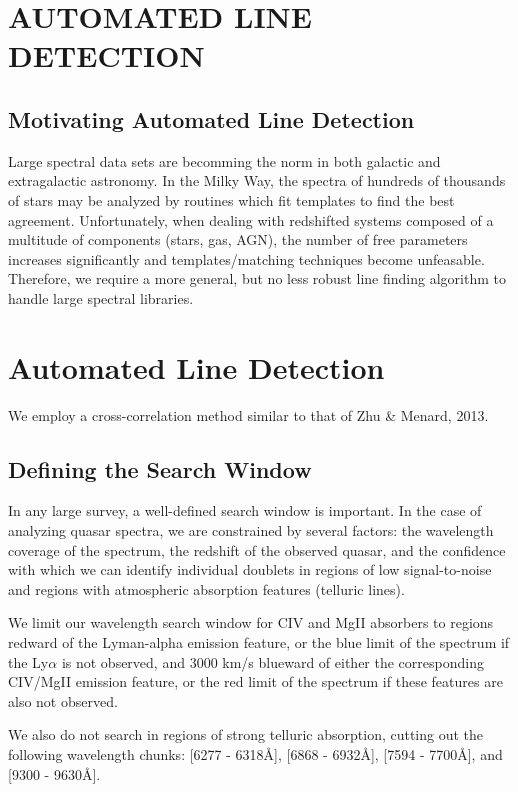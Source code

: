 \section{\MakeUppercase{Automated Line Detection}}
\label{chp3}

\subsection{Motivating Automated Line Detection}
\label{ch3:motivation}

Large spectral data sets are becomming the norm in both galactic and extragalactic astronomy. In the Milky Way, the spectra of hundreds of thousands of stars may be analyzed by routines which fit templates to find the best agreement. Unfortunately, when dealing with redshifted systems composed of a multitude of components (stars, gas, AGN), the number of free parameters increases significantly and templates/matching techniques become unfeasable. Therefore, we require a more general, but no less robust line finding algorithm to handle large spectral libraries.

\section{Automated Line Detection}
\label{ch3:detection}

We employ a cross-correlation method similar to that of Zhu \& Menard, 2013.

\subsection{Defining the Search Window}
\label{ch3:window}

In any large survey, a well-defined search window is important. In the case of analyzing quasar spectra, we are constrained by several factors: the wavelength coverage of the spectrum, the redshift of the observed quasar, and the confidence with which we can identify individual doublets in regions of low signal-to-noise and regions with atmospheric absorption features (telluric lines).

We limit our wavelength search window for CIV and MgII absorbers to regions redward of the Lyman-alpha emission feature, or the blue limit of the spectrum if the Ly$\alpha$ is not observed, and 3000 km/s blueward of either the corresponding CIV/MgII emission feature, or the red limit of the spectrum if these features are also not observed.

We also do not search in regions of strong telluric absorption, cutting out the following wavelength chunks: [6277 - 6318\AA], [6868 - 6932\AA], [7594 - 7700\AA], and [9300 - 9630\AA].

